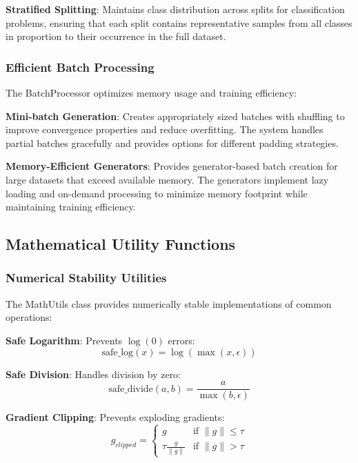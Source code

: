 \documentclass[11pt,a4paper]{report}
\begin{document}
\textbf{Stratified Splitting}: Maintains class distribution across splits for classification problems, ensuring that each split contains representative samples from all classes in proportion to their occurrence in the full dataset.

\subsubsection{Efficient Batch Processing}

The BatchProcessor optimizes memory usage and training efficiency:

\textbf{Mini-batch Generation}: Creates appropriately sized batches with shuffling to improve convergence properties and reduce overfitting. The system handles partial batches gracefully and provides options for different padding strategies.

\textbf{Memory-Efficient Generators}: Provides generator-based batch creation for large datasets that exceed available memory. The generators implement lazy loading and on-demand processing to minimize memory footprint while maintaining training efficiency.

\subsection{Mathematical Utility Functions}

\subsubsection{Numerical Stability Utilities}

The MathUtils class provides numerically stable implementations of common operations:

\textbf{Safe Logarithm}: Prevents $\log(0)$ errors:
\begin{equation}
\text{safe\_log}(x) = \log(\max(x, \epsilon))
\end{equation}

\textbf{Safe Division}: Handles division by zero:
\begin{equation}
\text{safe\_divide}(a, b) = \frac{a}{\max(b, \epsilon)}
\end{equation}

\textbf{Gradient Clipping}: Prevents exploding gradients:
\begin{equation}
g_{clipped} = \begin{cases}
g & \text{if } \|g\| \leq \tau \\
\tau \frac{g}{\|g\|} & \text{if } \|g\| > \tau
\end{cases}
\end{equation}
\end{document}
